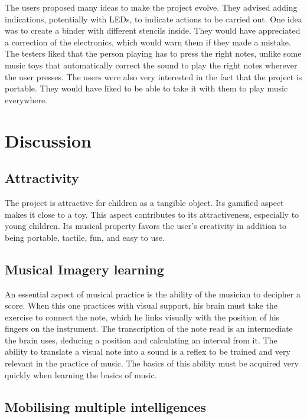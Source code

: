 The users proposed many ideas to make the project evolve. They advised adding indications, potentially with LEDs, to indicate actions to be carried out. One idea was to create a binder with different stencils inside. They would have appreciated a correction of the electronics, which would warn them if they made a mistake. The testers liked that the person playing has to press the right notes, unlike some music toys that automatically correct the sound to play the right notes wherever the user presses. The users were also very interested in the fact that the project is portable. They would have liked to be able to take it with them to play music everywhere.

\section{Discussion}

\subsection{Attractivity}

The project is attractive for children as a tangible object.
Its gamified aspect makes it close to a toy. This aspect contributes to its attractiveness, especially to young children. Its musical property favors the user's creativity in addition to being portable, tactile, fun, and easy to use.

\subsection{Musical Imagery learning}

An essential aspect of musical practice is the ability of the musician to decipher a score. When this one practices with visual support, his brain must take the exercise to connect the note, which he links visually with the position of his fingers on the instrument. The transcription of the note read is an intermediate the brain uses, deducing a position and calculating an interval from it. The ability to translate a visual note into a sound is a reflex to be trained and very relevant in the practice of music. The basics of this ability must be acquired very quickly when learning the basics of music.

\subsection{Mobilising multiple intelligences}

